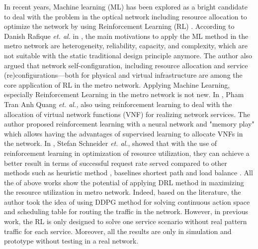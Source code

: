 \documentclass[conference]{IEEEtran}
\begin{document}
In recent years, Machine learning (ML) has been explored as a bright candidate to deal with the problem in the optical network including resource allocation to optimize the network by using Reinforcement Learning (RL) \cite{Gu2020}. According to Danish Rafique \textit{et. al.} in \cite{Rafique:18}, the main motivations to apply the ML method in the metro network are heterogeneity, reliability, capacity, and complexity, which are not suitable with the static traditional design principle anymore. The author also argued that network self-configuration, including resource allocation and service (re)configurations—both for physical and virtual infrastructure are among the core application of RL in the metro network. Applying Machine Learning, especially Reinforcement Learning in the metro network is not new. In \cite{8873660}, Pham Tran Anh Quang \textit{et. al.,} also using reinforcement learning to deal with the allocation of virtual network functions (VNF) for realizing network services. The author proposed reinforcement learning with a neural network and "memory play" which allows having the advantages of supervised learning to allocate VNFs in the network. In \cite{9269087}, Stefan Schneider \textit{et. al.}, showed that with the use of reinforcement learning in optimization of resource utilization, they can achieve a better result in terms of successful request rate served compared to other methods such as heuristic method \cite{8459915}, baselines shortest path and load balance \cite{8485853}. All the of above works show the potential of applying DRL method in maximizing the resource utilization in metro network. Indeed, based on the literature, the author took the idea of using DDPG method for solving continuous action space and scheduling table for routing the traffic in the network. However, in previous work, the RL is only designed to solve one service scenario without real pattern traffic for each service. Moreover, all the results are only in simulation and prototype without testing in a real network. 
\end{document}
